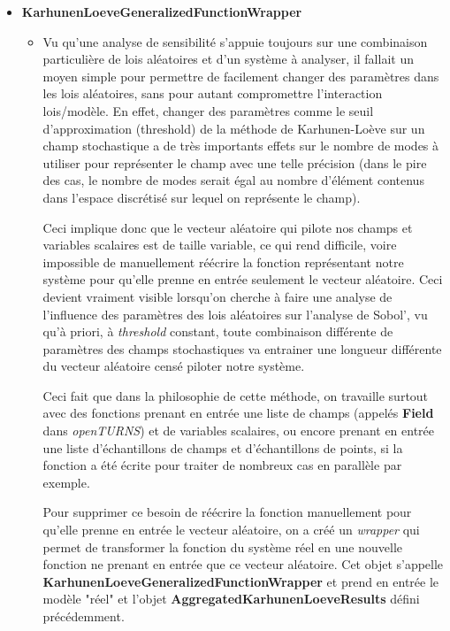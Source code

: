 \documentclass[a4paper,10pt]{article}
\begin{document}
\begin{itemize}
  
  \item \textbf{KarhunenLoeveGeneralizedFunctionWrapper}
  \begin{itemize}
    \item Vu qu'une analyse de sensibilité s'appuie toujours sur une combinaison particulière de lois aléatoires et d'un système à analyser, il fallait un moyen simple pour permettre de facilement changer des paramètres dans les lois aléatoires, sans pour autant compromettre l'interaction lois/modèle. En effet, changer des paramètres comme le seuil d'approximation (threshold) de la méthode de Karhunen-Loève sur un champ stochastique a de très importants effets sur le nombre de modes à utiliser pour représenter le champ avec une telle précision (dans le pire des cas, le nombre de modes serait égal au nombre d'élément contenus dans l'espace discrétisé sur lequel on représente le champ). \par \smallskip
 	Ceci implique donc que le vecteur aléatoire qui pilote nos champs et variables scalaires est de taille variable, ce qui rend difficile, voire impossible de manuellement réécrire la fonction représentant notre système pour qu'elle prenne en entrée seulement le vecteur aléatoire. Ceci devient vraiment visible lorsqu'on cherche à faire une analyse de l'influence des paramètres des lois aléatoires sur l'analyse de Sobol', vu qu'à priori, à \textit{threshold} constant, toute combinaison différente de paramètres des champs stochastiques va entrainer une longueur différente du vecteur aléatoire censé piloter notre système. \par \smallskip
  Ceci fait que dans la philosophie de cette méthode, on travaille surtout avec des fonctions prenant en entrée une liste de champs (appelés \textbf{Field} dans \textit{openTURNS}) et de variables scalaires, ou encore prenant en entrée une liste d'échantillons de champs et d'échantillons de points, si la fonction a été écrite pour traiter de nombreux cas en parallèle par exemple. \par \smallskip
  Pour supprimer ce besoin de réécrire la fonction manuellement pour qu'elle prenne en entrée le vecteur aléatoire, on a créé un \textit{wrapper} qui permet de transformer la fonction du système réel en une nouvelle fonction ne prenant en entrée que ce vecteur aléatoire. Cet objet s'appelle \textbf{KarhunenLoeveGeneralizedFunctionWrapper} et prend en entrée le modèle "réel" et l'objet \textbf{AggregatedKarhunenLoeveResults} défini précédemment.
  \end{itemize}  
 

\end{itemize}
\end{document}
